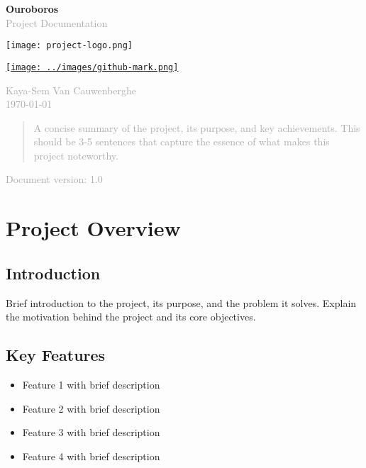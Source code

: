 \documentclass[10pt,a4paper]{article}
\newcommand{\projecttitle}[1]{
    \begin{center}
        {\Huge\bfseries\color{primary} #1}\\
        \vspace{0.5cm}
        \textcolor{darkgray}{\large Project Documentation}
    \end{center}
}
\begin{document}
\begin{titlepage}
	\centering
	\vspace*{2cm}

	\projecttitle{Ouroboros}

	\vspace{1cm}

	\texttt{[image: project-logo.png]} %

	\vspace{1cm}
	\begin{center}
		\href{https://github.com/Kaya-Sem/ouroboros}{\texttt{[image: ../images/github-mark.png]}}
	\end{center}

	\vspace{1cm}

	\textcolor{darkgray}{\large Kaya-Sem Van Cauwenberghe}\\
	\textcolor{darkgray}{\today}

	\vfill

	\begin{abstract}
		\noindent
		\textcolor{darkgray}{A concise summary of the project, its purpose, and key achievements. This should be 3-5 sentences that capture the essence of what makes this project noteworthy.}
	\end{abstract}

	\vspace{1cm}

	\small
	\textcolor{darkgray}{Document version: 1.0}
\end{titlepage}

\tableofcontents
\newpage

\section{Project Overview}
\subsection{Introduction}
Brief introduction to the project, its purpose, and the problem it solves. Explain the motivation behind the project and its core objectives.

\subsection{Key Features}
\begin{itemize}
	\item Feature 1 with brief description
	\item Feature 2 with brief description
	\item Feature 3 with brief description
	\item Feature 4 with brief description
\end{itemize}
\end{document}
